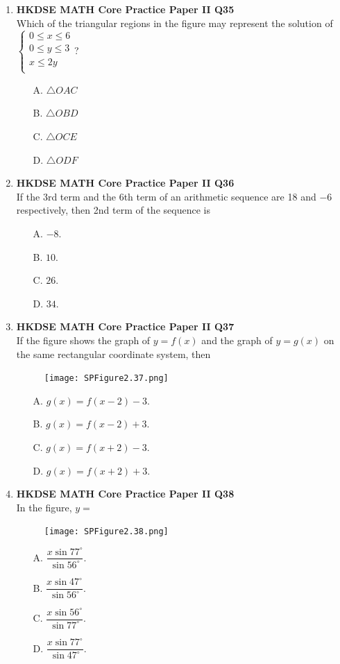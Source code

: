 \documentclass[12pt]{article}
\begin{document}
\begin{enumerate}
	\item \textbf{HKDSE MATH Core Practice Paper II Q35}\\
	Which of the triangular regions in the figure may represent the solution of $\left\{
		\begin{matrix}
			0 \leq x \leq 6\\
			0 \leq y \leq 3\\
			x \leq 2y\\
		\end{matrix}\right.$?
	\begin{enumerate}
		\item[A.] $\triangle OAC$
		\item[B.] $\triangle OBD$
		\item[C.] $\triangle OCE$
		\item[D.] $\triangle ODF$
	\end{enumerate}
	
	\item \textbf{HKDSE MATH Core Practice Paper II Q36}\\
	If the 3rd term and the 6th term of an arithmetic sequence are 18 and $-6$ respectively, then 2nd term of the sequence is
	\begin{enumerate}
		\item[A.] $-8$.
		\item[B.] $10$.
		\item[C.] $26$.
		\item[D.] $34$.
	\end{enumerate}
	
	\item \textbf{HKDSE MATH Core Practice Paper II Q37}\\
	If the figure shows the graph of $y = f(x)$ and the graph of $y = g(x)$ on the same rectangular coordinate system, then
	\begin{figure}[H]
		\centering
		\texttt{[image: SPFigure2.37.png]}	
	\end{figure}
	\begin{enumerate}
		\item[A.] $g(x) = f(x - 2) - 3$.
		\item[B.] $g(x) = f(x - 2) + 3$.
		\item[C.] $g(x) = f(x + 2) - 3$.
		\item[D.] $g(x) = f(x + 2) + 3$.
	\end{enumerate}
	
	\item \textbf{HKDSE MATH Core Practice Paper II Q38}\\
	In the figure, $y = $
	\begin{figure}[H]
		\centering
		\texttt{[image: SPFigure2.38.png]}	
	\end{figure}
	\begin{enumerate}
		\item[A.] $\dfrac{x\sin{77^\circ}}{\sin{56^\circ}}$.
		\item[B.] $\dfrac{x\sin{47^\circ}}{\sin{56^\circ}}$.
		\item[C.] $\dfrac{x\sin{56^\circ}}{\sin{77^\circ}}$.
		\item[D.] $\dfrac{x\sin{77^\circ}}{\sin{47^\circ}}$.
	\end{enumerate}
	

\end{enumerate}
\end{document}

